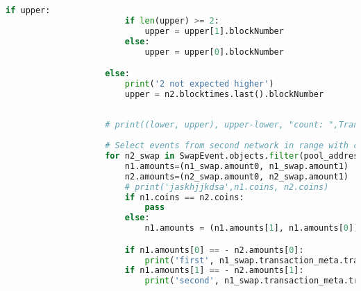 \begin{lstlisting}[language=python]
                    if upper:
                        if len(upper) >= 2:
                            upper = upper[1].blockNumber
                        else:
                            upper = upper[0].blockNumber

                    else:
                        print('2 not expected higher')
                        upper = n2.blocktimes.last().blockNumber
                    
                        
                    # print((lower, upper), upper-lower, "count: ",TransactionMeta.objects.filter(blockNumber__gte=lower, blockNumber__lte=upper).count())
                    
                    # Select events from second network in range with coin0, coin1
                    for n2_swap in SwapEvent.objects.filter(pool_address__in=n2.pools, transaction_meta__blockNumber__gte=lower, transaction_meta__blockNumber__lte=upper).exclude(recipient__in=router_addresses, sender__in=router_addresses):
                        n1.amounts=(n1_swap.amount0, n1_swap.amount1)
                        n2.amounts=(n2_swap.amount0, n2_swap.amount1)
                        # print('jaskhjjkdsa',n1.coins, n2.coins)
                        if n1.coins == n2.coins:
                            pass
                        else:
                            n1.amounts = (n1.amounts[1], n1.amounts[0])

                        if n1.amounts[0] == - n2.amounts[0]:
                            print('first', n1_swap.transaction_meta.transactionHash, n2_swap.transaction_meta.transactionHash)
                        if n1.amounts[1] == - n2.amounts[1]:
                            print('second', n1_swap.transaction_meta.transactionHash, n2_swap.transaction_meta.transactionHash)
                        
\end{lstlisting}